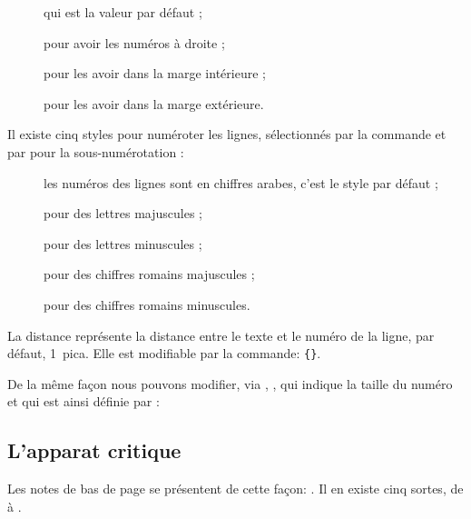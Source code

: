\begin{description}
\item[] qui est la valeur par défaut ;
\item[] pour avoir les numéros  à droite ;
\item[] pour les avoir dans la marge intérieure ;
\item[] pour les avoir dans la marge extérieure.
\end{description}

Il existe   cinq styles pour numéroter les lignes, sélectionnés par la commande 
 et par  pour la sous-numérotation :

\begin{description} 
\item[] les numéros des lignes sont en chiffres arabes, c'est le style par défaut ; 
\item[] pour des lettres majuscules ;
\item[] pour des lettres minuscules ;
\item[] pour des chiffres romains majuscules ; 
\item[] pour des chiffres romains minuscules. 
\end{description}

La distance  représente la distance entre le texte et le numéro de la ligne, par défaut, 1~pica. 
Elle est  modifiable par la commande:
\verb|{|\verb|}|. 

De la même façon nous pouvons modifier, via , , qui indique la taille du numéro et qui est ainsi définie par :

\begin{latexcode}
\newcommand{\numlabfont}{\normalfont\scriptsize}
\end{latexcode}
 

\subsection{L'apparat critique}

Les notes de bas de page se présentent de cette façon:  . Il en existe cinq sortes, de  à .


